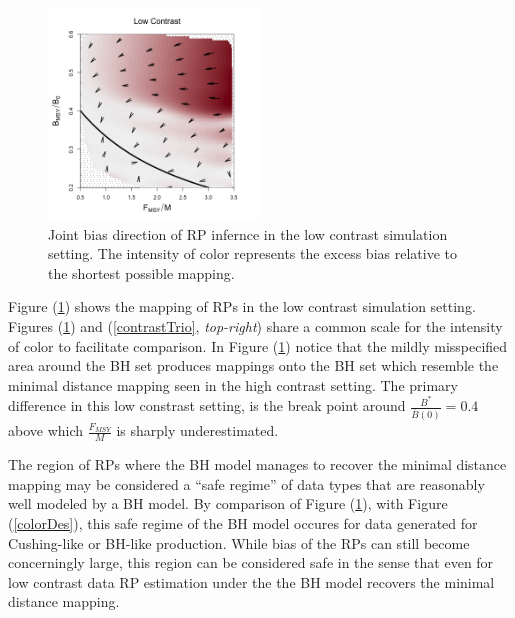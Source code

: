 \documentclass[12pt]{article}
\begin{document}
%
\begin{figure}
\vspace{-0.5cm}
\includegraphics[width=0.5\textwidth]{../gpBias/directionalBiasSchnuteSubHHardFlatT30N150WWideN112.png}
\vspace{-1cm}
\caption{
Joint bias direction of RP infernce in the low contrast simulation setting.
The intensity of color represents the excess bias relative
to the shortest possible mapping. 
}
\label{bhLowArrows}
\end{figure}


%
Figure (\ref{bhLowArrows}) shows the mapping of RPs in the low contrast 
simulation setting. Figures (\ref{bhLowArrows}) and (\ref{contrastTrio}, 
\emph{top-right}) share a common scale for the intensity of color to 
facilitate comparison. In Figure (\ref{bhLowArrows}) notice that the mildly 
misspecified area around the BH set produces mappings onto the BH set which 
resemble the minimal distance mapping seen in the high contrast setting. %
The primary difference in this low constrast setting, is the break point 
around $\frac{B^*}{\bar B(0)}=0.4$ above which $\frac{F_{MSY}}{M}$ is sharply 
underestimated. 

%
The region of RPs where the BH model manages to recover the minimal distance 
mapping may be considered a ``safe regime'' of data types that are 
reasonably well modeled by a BH model. By comparison of Figure (\ref{bhLowArrows}), 
with Figure (\ref{colorDes}), this safe regime of the BH model occures for data 
generated for Cushing-like or BH-like production. While bias of the RPs can still become concerningly large, %
this region can be considered safe in the sense that even for low contrast data 
RP estimation under the the BH model recovers the minimal distance mapping.
\end{document}
